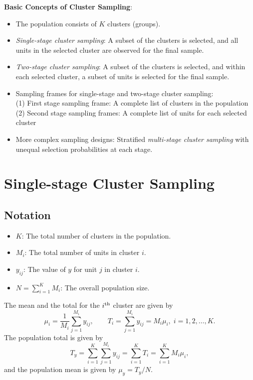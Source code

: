 \textbf{Basic Concepts of Cluster Sampling}:
\begin{itemize}
      \item The population consists of $K$ clusters (groups).
      \item \emph{Single-stage cluster sampling}: A subset of the clusters is
            selected, and all units in the selected cluster are observed for the
            final sample.
      \item \emph{Two-stage cluster sampling}: A subset of the clusters is selected,
            and within each selected cluster, a subset of units is selected for
            the final sample.
      \item Sampling frames for single-stage and two-stage cluster sampling:\\
            (1) First stage sampling frame: A complete list of clusters in the
            population\\
            (2) Second stage sampling frames: A complete list of units for
            each selected cluster
      \item More complex sampling designs: Stratified \emph{multi-stage cluster
                  sampling} with unequal selection probabilities at each stage.
\end{itemize}

\section{Single-stage Cluster Sampling}
\subsection{Notation}
\begin{itemize}
      \item $ K $: The total number of clusters in the population.
      \item $ M_i $: The total number of units in cluster $ i $.
      \item $ y_{ij} $: The value of $ y $ for unit $ j $ in cluster $ i $.
      \item $ N=\sum_{i=1}^{K}M_i $: The overall population size.
\end{itemize}
The mean and the total for the $ i\textsuperscript{th} $ cluster are given by
\[ \mu_i=\frac{1}{M_i}\sum_{j=1}^{M_i}y_{ij},\qquad T_i=\sum_{j=1}^{M_i}y_{ij}=M_i \mu_i,\; i=1,2,\ldots,K. \]
The population total is given by
\[ T_y=\sum_{i=1}^{K}\sum_{j=1}^{M_i}y_{ij}=\sum_{i=1}^{K}T_i=\sum_{i=1}^{K}M_i \mu_i, \]
and the population mean is given by $ \mu_y=T_y/N $.

